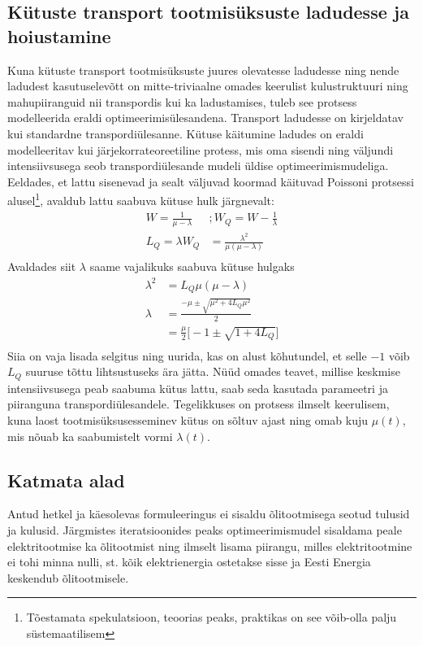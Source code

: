 \documentclass[twosided, 10pt, a4paper]{article}
\begin{document}
\subsection{K\"utuste transport tootmis\"uksuste ladudesse ja hoiustamine}
Kuna k\"utuste transport tootmis\"uksuste juures olevatesse ladudesse ning nende ladudest ka\-su\-tu\-se\-le\-v\~ott on mitte-triviaalne omades keerulist kulustruktuuri ning mahupiiranguid nii transpordis kui ka ladustamises, tuleb see protsess modelleerida eraldi optimeerimis\"ulesandena. Transport ladudesse on kirjeldatav kui standardne transpordi\"ulesanne\cite{hillier}. K\"utuse k\"aitumine ladudes on eraldi modelleeritav kui j\"ar\-je\-kor\-ra\-teo\-ree\-ti\-li\-ne protess, mis oma sisendi ning v\"al\-jun\-di intensiivsusega seob trans\-por\-di\"ules\-an\-de mudeli \"ul\-di\-se optimeerimismudeliga\cite{ross}.
Eeldades, et lattu sisenevad ja sealt v\"aljuvad koormad k\"aituvad Poissoni protsessi alusel\footnote{T\~oestamata spekulatsioon, teoorias peaks, praktikas on see v\~oib-olla palju s\"ustemaatilisem}, avaldub lattu saabuva k\"utuse hulk j\"argnevalt:
\begin{align}
W = \frac{1}{\mu - \lambda} &; W_Q = W - \frac{1}{\lambda} \nonumber \\
L_Q = \lambda W_Q & = \frac{\lambda^2}{\mu(\mu - \lambda)} \\
\nonumber
\end{align}
Avaldades siit $\lambda$ saame vajalikuks saabuva k\"utuse hulgaks
\begin{align}
\lambda^2 &= L_Q\mu(\mu - \lambda) \nonumber \\
\lambda &= \frac{-\mu \pm \sqrt{\mu^2 + 4L_Q\mu^2}}{2} \nonumber \\
&= \frac{\mu}{2}\bigg[ -1 \pm \sqrt{1 + 4L_Q}\bigg] \\
\nonumber
\end{align}
Siia on vaja lisada selgitus ning uurida, kas on alust k\~ohutundel, et selle $-1$ v\~oib $L_Q$ suuruse t\~ottu lihtsustuseks \"ara j\"atta. N\"u\"ud omades teavet, millise keskmise intensiivsusega peab saabuma k\"utus lattu, saab seda kasutada parameetri ja piiranguna transpordi\"ulesandele. Tegelikkuses on protsess ilmselt keerulisem, kuna laost tootmis\"uksusesseminev k\"utus on s\~oltuv ajast ning omab kuju $\mu(t)$, mis n\~ouab ka saabumistelt vormi $\lambda(t)$\cite{bartholdi}. 

\subsection{Katmata alad}
Antud hetkel ja k\"aesolevas formuleeringus ei sisaldu \~olitootmisega seotud tulusid ja kulusid. J\"argmistes iteratsioonides peaks optimeerimismudel sisaldama peale elektritootmise ka \~olitootmist ning ilmselt lisama piirangu, milles elektritootmine ei tohi minna nulli, st. k\~oik elektrienergia ostetakse sisse ja Eesti Energia keskendub \~olitootmisele.
\end{document}
